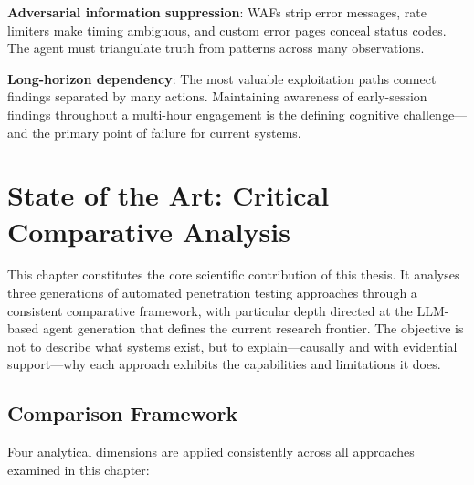 \documentclass[12pt,a4paper,oneside,openany]{book}
\begin{document}
\textbf{Adversarial information suppression}: WAFs strip error messages, rate limiters make timing ambiguous, and custom error pages conceal status codes. The agent must triangulate truth from patterns across many observations.

\textbf{Long-horizon dependency}: The most valuable exploitation paths connect findings separated by many actions. Maintaining awareness of early-session findings throughout a multi-hour engagement is the defining cognitive challenge---and the primary point of failure for current systems.


\chapter{State of the Art: Critical Comparative Analysis}
\label{ch:sota}

This chapter constitutes the core scientific contribution of this thesis. It analyses three generations of automated penetration testing approaches through a consistent comparative framework, with particular depth directed at the LLM-based agent generation that defines the current research frontier. The objective is not to describe what systems exist, but to explain---causally and with evidential support---why each approach exhibits the capabilities and limitations it does.

\section{Comparison Framework}

Four analytical dimensions are applied consistently across all approaches examined in this chapter:
\end{document}
